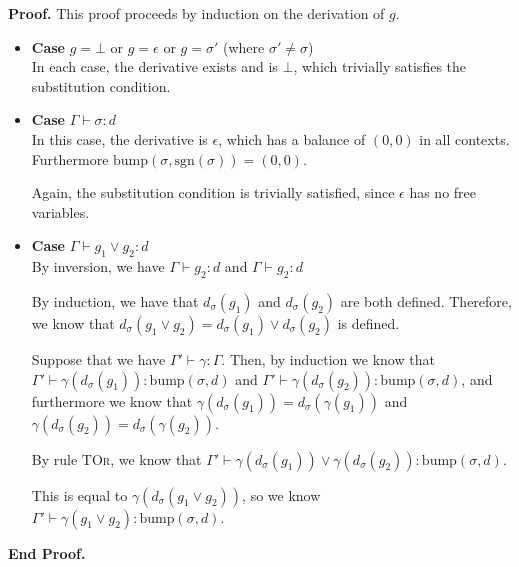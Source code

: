 \documentclass{article}
\newcommand{\judgebalance}[3][\Gamma]{{#1} \vdash {#2} : {#3}}
\newcommand{\judgesubst}[3]{{#1} \vdash {#2} : {#3}}
\newcommand{\zero}{(0,0)}
\newcommand{\deriv}[2]{d_{#1}({#2})}
\newcommand{\bump}[2]{\mathrm{bump}({#1}, {#2})}
\newcommand{\sgn}[1]{\mathrm{sgn}({#1})}
\newenvironment{proof}{\noindent\textbf{Proof.}}{\noindent\textbf{End Proof.}}
\newenvironment{caseblock}{\begin{itemize}}{\end{itemize}}
\newenvironment{case}[1]{\item \textbf{Case} {#1}\\}{}
\begin{document}
\begin{proof}
  This proof proceeds by induction on the derivation of $g$. 

  \begin{caseblock}
    \begin{case}{$g = \bot$ or $g = \epsilon$ or $g = \sigma'$ (where $\sigma' \not= \sigma$)}
      In each case, the derivative exists and is $\bot$, which trivially satisfies the 
      substitution condition. 
    \end{case}

    \begin{case}{$\judgebalance{\sigma}{d}$}
      In this case, the derivative is $\epsilon$, which has a balance of $\zero$ in all 
      contexts. Furthermore $\bump{\sigma}{\sgn{\sigma}} = \zero$. 

      Again, the substitution condition is trivially satisfied, since $\epsilon$ has
      no free variables. 
    \end{case}

    \begin{case}{$\judgebalance{g_1 \vee g_2}{d}$}
      By inversion, we have $\judgebalance{g_2}{d}$ and $\judgebalance{g_2}{d}$
      
      By induction, we have that $\deriv{\sigma}{g_1}$ and $\deriv{\sigma}{g_2}$ are
      both defined. Therefore, we know that $\deriv{\sigma}{g_1 \vee g_2} = \deriv{\sigma}{g_1} \vee 
      \deriv{\sigma}{g_2}$ is defined.

      Suppose that we have $\judgesubst{\Gamma'}{\gamma}{\Gamma}$. Then, by 
      induction we know that $\judgebalance[\Gamma']{\gamma(\deriv{\sigma}{g_1})}{\bump{\sigma}{d}}$ and 
      $\judgebalance[\Gamma']{\gamma(\deriv{\sigma}{g_2})}{\bump{\sigma}{d}}$, and furthermore 
      we know that $\gamma(\deriv{\sigma}{g_1}) = \deriv{\sigma}{\gamma(g_1)}$ and 
      $\gamma(\deriv{\sigma}{g_2}) = \deriv{\sigma}{\gamma(g_2)}$. 

      By rule \textsc{TOr}, we know that $\judgebalance[\Gamma']{\gamma(\deriv{\sigma}{g_1}) \vee \gamma(\deriv{\sigma}{g_2})}{\bump{\sigma}{d}}$. 

      This is equal to $\gamma(\deriv{\sigma}{g_1 \vee g_2})$, so we
      know $\judgebalance[\Gamma']{\gamma(g_1 \vee g_2)}{\bump{\sigma}{d}}$.


\end{case}
\end{caseblock}
\end{proof}
\end{document}
